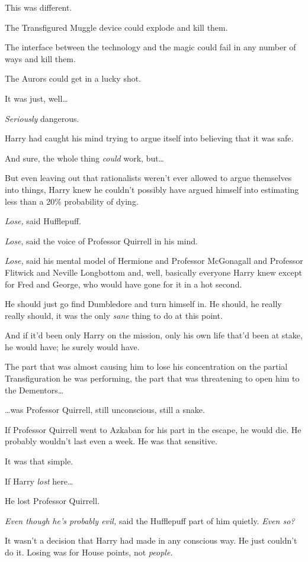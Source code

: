 This was different.

The Transfigured Muggle device could explode and kill them.

The interface between the technology and the magic could fail in any number of ways and kill them.

The Aurors could get in a lucky shot.

It was just, well…

\emph{Seriously} dangerous.

Harry had caught his mind trying to argue itself into believing that it was safe.

And sure, the whole thing \emph{could} work, but…

But even leaving out that rationalists weren’t ever allowed to argue themselves into things, Harry knew he couldn’t possibly have argued himself into estimating less than a 20\% probability of dying.

\emph{Lose,} said Hufflepuff.

\emph{Lose}, said the voice of Professor Quirrell in his mind.

\emph{Lose,} said his mental model of Hermione and Professor McGonagall and Professor Flitwick and Neville Longbottom and, well, basically everyone Harry knew except for Fred and George, who would have gone for it in a hot second.

He should just go find Dumbledore and turn himself in. He should, he really really should, it was the only \emph{sane} thing to do at this point.

And if it’d been only Harry on the mission, only his own life that’d been at stake, he would have; he surely would have.

The part that was almost causing him to lose his concentration on the partial Transfiguration he was performing, the part that was threatening to open him to the Dementors…

…was Professor Quirrell, still unconscious, still a snake.

If Professor Quirrell went to Azkaban for his part in the escape, he would die. He probably wouldn’t last even a week. He was that sensitive.

It was that simple.

If Harry \emph{lost} here…

He lost Professor Quirrell.

\emph{Even though he’s probably evil,} said the Hufflepuff part of him quietly. \emph{Even so?}

It wasn’t a decision that Harry had made in any conscious way. He just couldn’t do it. Losing was for House points, not \emph{people.}

